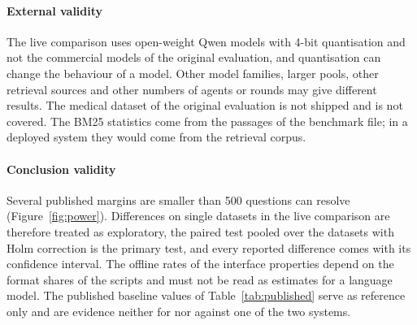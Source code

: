 \paragraph{External validity}
The live comparison uses open-weight Qwen models with 4-bit quantisation and not the commercial models of the original evaluation, and quantisation can change the behaviour of a model. Other model families, larger pools, other retrieval sources and other numbers of agents or rounds may give different results. The medical dataset of the original evaluation is not shipped and is not covered. The BM25 statistics come from the passages of the benchmark file; in a deployed system they would come from the retrieval corpus.

\paragraph{Conclusion validity}
Several published margins are smaller than 500 questions can resolve (Figure~\ref{fig:power}). Differences on single datasets in the live comparison are therefore treated as exploratory, the paired test pooled over the datasets with Holm correction is the primary test, and every reported difference comes with its confidence interval. The offline rates of the interface properties depend on the format shares of the scripts and must not be read as estimates for a language model. The published baseline values of Table~\ref{tab:published} serve as reference only and are evidence neither for nor against one of the two systems.
